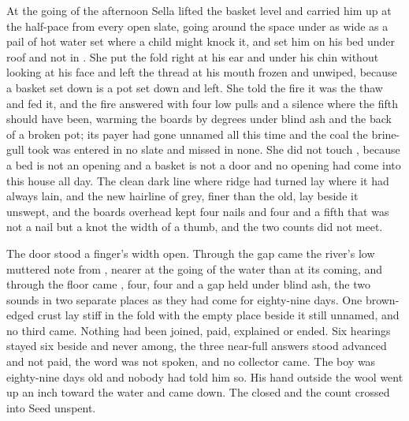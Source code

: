 At the going of the afternoon Sella lifted the basket level and carried him up at the half-pace from every open slate, going around the space under  as wide as a pail of hot water set where a child might knock it, and set him on his bed under  roof and not in . She put the fold right at his ear and under his chin without looking at his face and left the thread at his mouth frozen and unwiped, because a basket set down is a pot set down and left. She told the fire it was the thaw and fed it, and the fire answered with four low pulls and a silence where the fifth should have been, warming the boards by degrees under blind ash and the back of a broken pot; its payer had gone unnamed all this time and the coal the brine-gull took was entered in no slate and missed in none. She did not touch , because a bed is not an opening and a basket is not a door and no opening had come into this house all day. The clean dark line where  ridge had turned lay where it had always lain, and the new hairline of grey, finer than the old, lay beside it unswept, and the boards overhead kept four nails and four and a fifth that was not a nail but a knot the width of a thumb, and the two counts did not meet.

The door stood a finger's width open. Through the gap came the river's low muttered note from , nearer at the going of the water than at its coming, and through the floor came , four, four and a gap held under blind ash, the two sounds in two separate places as they had come for eighty-nine days. One brown-edged crust lay stiff in the fold with the empty place beside it still unnamed, and no third came. Nothing had been joined, paid, explained or ended. Six hearings stayed six beside and never among, the three near-full answers stood advanced and not paid, the word was not spoken, and no collector came. The boy was eighty-nine days old and nobody had told him so. His hand outside the wool went up an inch toward the water and came down. The  closed and the count crossed into Seed unspent.

